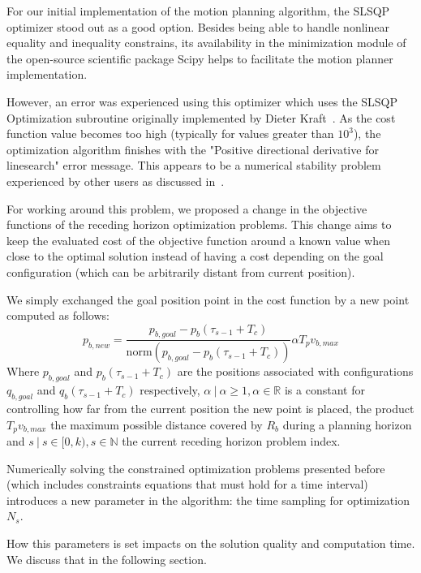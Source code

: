 \documentclass[eprint]{actapoly}
\begin{document}
For our initial implementation of the motion planning algorithm, the
SLSQP optimizer stood out
as a good option. Besides being able to handle nonlinear equality and inequality 
constrains, its availability in the minimization module of the open-source
scientific package Scipy helps to facilitate the motion planner implementation.

However, an error was experienced using this optimizer which uses the SLSQP 
Optimization subroutine originally implemented by Dieter Kraft~\cite{Kraft1988}.
As the cost function value becomes too high (typically for values greater than 
$10^3$), the optimization algorithm finishes with the "Positive 
directional derivative for linesearch" error message. This appears to be
a numerical stability problem experienced by other users as discussed in~\cite{slsqperror}.

For working around this problem, we proposed a change in the objective functions
of the receding horizon optimization problems. This change aims to keep the 
evaluated cost of the objective function around a known value when close to the optimal
solution instead of having a cost depending on the goal configuration (which can be arbitrarily distant from current position).

We simply exchanged the goal position point in the cost function by a new point computed as follows:
$$
    p_{b,new} = \frac{p_{b,goal} - p_{b}(\tau_{s-1}+T_c) }{\mathrm{norm}(p_{b,goal} - p_{b}(\tau_{s-1}+T_c) )} \alpha T_pv_{b,max}
$$
Where $p_{b,goal}$ and $p_{b}(\tau_{s-1}+T_c)$ are the positions associated with configurations $q_{b,goal}$ and $q_{b}(\tau_{s-1}+T_c)$ respectively, $\alpha\ |\ 
\alpha \geq 1, \alpha \in \mathbb{R}$ is a constant for controlling how far from the
current position the new point is placed, the product $T_pv_{b,max}$ the maximum possible distance covered by $R_b$ during a planning horizon and $s\ |\ s \in [0, k), s \in \mathbb{N}$ the current receding horizon problem index.

Numerically solving the constrained optimization problems presented before (which includes constraints equations that must hold for a time interval) introduces
a new parameter in the algorithm: the time sampling for optimization $N_s$.

How this parameters is set impacts on the solution quality and computation time. We
discuss that in the following section.
\end{document}
